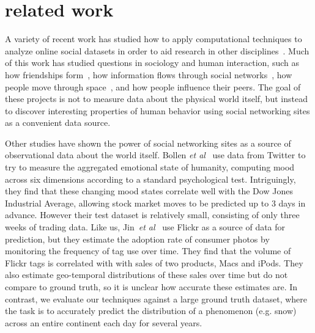 \documentclass[10pt,journal,compsoc]{IEEEtran}
\begin{document}

\section{related work}
\label{sec:relatedwork}


A variety of recent work has studied how to apply computational
techniques to analyze online social datasets in order to aid research
in other disciplines~\cite{lazer09}. Much of this work has studied
questions in sociology and human interaction, such as how friendships
form~\cite{feedback08kdd}, how information flows through social
networks~\cite{libennowell08}, how people move through
space~\cite{brockmann06}, and how people influence their
peers\cite{anagnostpopoulos08}.  The goal of these projects is not to
measure data about the physical world itself, but instead to discover
interesting properties of human behavior using social networking sites
as a convenient data source.

Other studies have shown the power of social networking sites as a
source of observational data about the world itself.  Bollen
\textit{et al}~\cite{bollen11twitter} use data from Twitter to try to measure
the aggregated emotional state of humanity, computing mood across six
dimensions according to a standard psychological
test. Intriguingly, they find that these changing mood states
correlate well with the Dow Jones Industrial Average, allowing stock
market moves to be predicted up to 3 days in advance.  However their
test dataset is relatively small, consisting of only three weeks of
trading data.  Like us, Jin~\textit{et al}~\cite{jin10prediction} use
Flickr as a source of data for prediction, but they estimate the
adoption rate of consumer photos by monitoring the frequency of tag
use over time. They find that the volume of Flickr tags is 
correlated  with with sales of two products, Macs and iPods. They also
estimate geo-temporal distributions of these sales over time but do
not compare to ground truth, so it is unclear how accurate these
estimates are. In contrast, we evaluate our techniques against a large
ground truth dataset, where the task is to accurately predict the
distribution of a phenomenon (e.g. snow) across an entire continent 
each day for several years.
\end{document}
